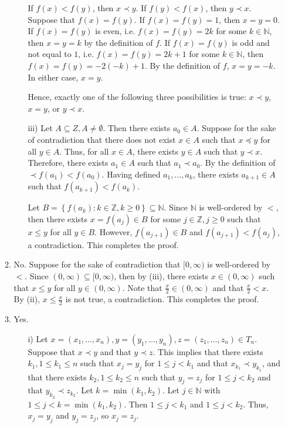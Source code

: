 \documentclass[letterpaper, reqno,11pt]{article}
\newcommand{\ZZ}{\mathbb{Z}}
\newcommand{\NN}{\mathbb{N}}
\begin{document}
\begin{enumerate}
\begin{enumerate}
\begin{enumerate}
            If $f(x) < f(y)$, then $x \prec y$. If $f(y) < f(x)$, then $y \prec x$. Suppose that $f(x) = f(y)$. If $f(x) = f(y) = 1$, then $x = y = 0$. If $f(x) = f(y)$ is even, i.e. $f(x) = f(y) = 2k$ for some $k \in \NN$, then $x = y = k$ by the definition of $f$. If $f(x) = f(y)$ is odd and not equal to $1$, i.e. $f(x) = f(y) = 2k + 1$ for some $k \in \NN$, then $f(x) = f(y) = -2(-k) + 1$. By the definition of $f$, $x = y = -k$. In either case, $x = y$.

            Hence, exactly one of the following three possibilities is true: $x \prec y$, $x = y$, or $y \prec x$.
            \item[iii)] Let $A \subseteq Z, A \neq \emptyset$. Then there exists $a_0 \in A$. Suppose for the sake of contradiction that there does not exist $x \in A$ such that $x \preceq y$ for all $y \in A$. Thus, for all $x \in A$, there exists $y \in A$ such that $y \prec x$. Therefore, there exists $a_1 \in A$ such that $a_1 \prec a_0$. By the definition of $\prec f\left(a_1\right)  < f\left(a_0\right)$. Having defined $a_1, \ldots, a_k$, there exists $a_{k + 1} \in A$ such that $f\left(a_{k + 1}\right) < f\left(a_k\right)$.

            Let $B = \left\{ f\left(a_k\right) : k \in \ZZ, k \geq 0 \right\} \subseteq \NN$. Since $\NN$ is well-ordered by $<$, then there exists $x = f\left(a_j\right) \in B$ for some $j \in \ZZ, j \geq 0$ such that $x \leq y$ for all $y \in B$. However, $f\left(a_{j + 1}\right) \in B$ and $f\left(a_{j + 1}\right) < f\left(a_j\right)$, a contradiction. This completes the proof.
        \end{enumerate}
        \item No. Suppose for the sake of contradiction that $[0, \infty)$ is well-ordered by $<$. Since $(0, \infty) \subseteq [0, \infty)$, then by (iii), there exists $x \in (0, \infty)$ such that $x \leq y$ for all $y \in (0, \infty)$. Note that $\frac{x}{2} \in (0, \infty)$ and that $\frac{x}{2} < x$. By (ii), $x \leq \frac{x}{2}$ is not true, a contradiction. This completes the proof.
        \item Yes.
        \begin{enumerate}
            \item[i)] Let $x = \left(x_1, \ldots, x_n\right), y = \left(y_1, \ldots, y_n\right), z = \left(z_1, \ldots, z_n\right) \in T_n$. Suppose that $x \prec y$ and that $y \prec z$. This implies that there exists $k_1, 1 \leq k_1 \leq n$ such that $x_j = y_j$ for $1 \leq j < k_1$ and that $x_{k_1} \prec y_{k_1}$, and that there exists $k_2, 1 \leq k_2 \leq n$ such that $y_j = z_j$ for $1 \leq j < k_2$ and that $y_{k_2} \prec z_{k_2}$. Let $k = \min\left(k_1, k_2\right)$. Let $j \in \NN$ with $1 \leq j < k = \min\left(k_1, k_2\right)$. Then $1 \leq j < k_1$ and $1 \leq j < k_2$. Thus, $x_j = y_j$ and $y_j = z_j$, so $x_j = z_j$.


\end{enumerate}
\end{enumerate}
\end{enumerate}
\end{document}
